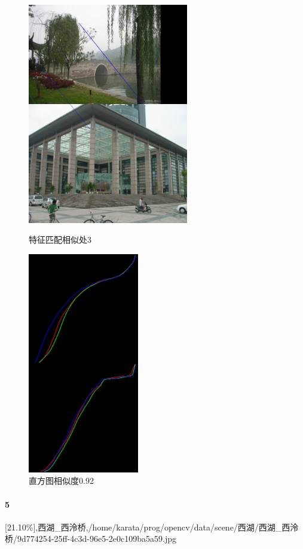 \begin{figure}[htb]
\begin{minipage}[t]{0.5\linewidth}
\centering
\includegraphics[height=3.8in]{西泠.jpg.d/im4sift.jpg}
\caption{特征匹配相似处3}
\label{fig:side:a}
\end{minipage}%
\begin{minipage}[t]{0.5\linewidth}
\centering
\includegraphics[height=3.8in]{西泠.jpg.d/im4hist2.jpg}
\caption{直方图相似度0.92}
\label{fig:side:a}
\end{minipage}%
\end{figure}

\paragraph{5}
[21.10\%],西湖\_西泠桥,/home/karata/prog/opencv/data/scene/西湖/西湖\_西泠桥/9d774254-25ff-4c3d-96e5-2e0c109ba5a59.jpg

